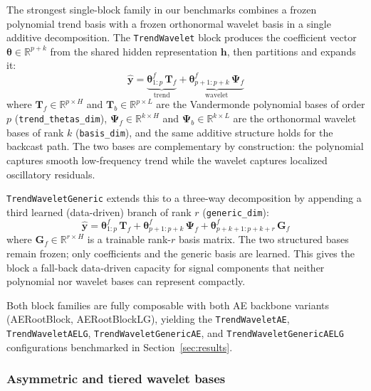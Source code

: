 \documentclass[11pt,a4paper]{article}
\begin{document}
The strongest single-block family in our benchmarks combines a frozen polynomial trend basis with a frozen orthonormal wavelet basis in a single additive decomposition. The \texttt{TrendWavelet} block produces the coefficient vector $\boldsymbol{\theta} \in \mathbb{R}^{p + k}$ from the shared hidden representation $\mathbf{h}$, then partitions and expands it:
\begin{equation*}
\hat{\mathbf{y}} = \underbrace{\boldsymbol{\theta}^f_{1:p}\,\mathbf{T}_f}_{\text{trend}} + \underbrace{\boldsymbol{\theta}^f_{p+1:p+k}\,\boldsymbol{\Psi}_f}_{\text{wavelet}}
\end{equation*}
where $\mathbf{T}_f \in \mathbb{R}^{p \times H}$ and $\mathbf{T}_b \in \mathbb{R}^{p \times L}$ are the Vandermonde polynomial bases of order $p$ (\texttt{trend\_thetas\_dim}), $\boldsymbol{\Psi}_f \in \mathbb{R}^{k \times H}$ and $\boldsymbol{\Psi}_b \in \mathbb{R}^{k \times L}$ are the orthonormal wavelet bases of rank $k$ (\texttt{basis\_dim}), and the same additive structure holds for the backcast path. The two bases are complementary by construction: the polynomial captures smooth low-frequency trend while the wavelet captures localized oscillatory residuals.

\texttt{TrendWaveletGeneric} extends this to a three-way decomposition by appending a third learned (data-driven) branch of rank $r$ (\texttt{generic\_dim}):
\begin{equation*}
\hat{\mathbf{y}} = \boldsymbol{\theta}^f_{1:p}\,\mathbf{T}_f + \boldsymbol{\theta}^f_{p+1:p+k}\,\boldsymbol{\Psi}_f + \boldsymbol{\theta}^f_{p+k+1:p+k+r}\,\mathbf{G}_f
\end{equation*}
where $\mathbf{G}_f \in \mathbb{R}^{r \times H}$ is a trainable rank-$r$ basis matrix. The two structured bases remain frozen; only coefficients and the generic basis are learned. This gives the block a fall-back data-driven capacity for signal components that neither polynomial nor wavelet bases can represent compactly.

Both block families are fully composable with both AE backbone variants (AERootBlock, AERootBlockLG), yielding the \texttt{TrendWaveletAE}, \texttt{TrendWaveletAELG}, \texttt{TrendWaveletGenericAE}, and \texttt{TrendWaveletGenericAELG} configurations benchmarked in Section~\ref{sec:results}.

\subsubsection{Asymmetric and tiered wavelet bases}
\end{document}
